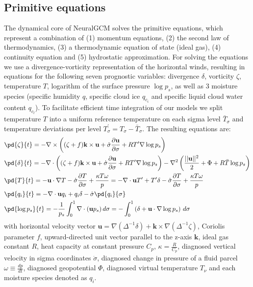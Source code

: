 \subsection{Primitive equations}\label{apx:subsec:dycore_equations}
The dynamical core of NeuralGCM solves the primitive equations, which represent a combination of (1) momentum equations, (2) the second law of thermodynamics, (3) a thermodynamic equation of state (ideal gas), (4) continuity equation and (5) hydrostatic approximation. For solving the equations we use a divergence-vorticity representation of the horizontal winds, resulting in equations for the following seven prognostic variables: divergence $\delta$, vorticity $\zeta$, temperature $T$, logarithm of the surface pressure $\log p_{s}$, as well as $3$ moisture species (specific humidity $q$, specific cloud ice $q_{c_i}$ and specific liquid cloud water content $q_{c_l}$). To facilitate efficient time integration of our models we split temperature $T$ into a uniform reference temperature on each sigma level $\bar{T}_{\sigma}$ and temperature deviations per level $T^{\prime}_{\sigma} = T_\sigma - \bar{T}_{\sigma}$. The resulting equations are:
\begin{align}
\begin{split}
&\pd{\zeta}{t} =-\nabla\times\left((\zeta + f)\mathbf k\times\mathbf u
    +\dot\sigma\frac{\partial\mathbf u}{\partial\sigma} + RT^\prime\nabla\log p_s \right) \\
&\pd{\delta}{t} =-\nabla\cdot\left((\zeta + f)\mathbf k\times\mathbf u
    +\dot\sigma\frac{\partial\mathbf u}{\partial\sigma} + RT^\prime\nabla\log p_s \right)
    -\nabla^2\left(\frac{||\mathbf u||^2}{2} + \Phi + R \bar{T}\log p_s \right) \\
&\pd{T}{t} =-\mathbf u\cdot\nabla T -\dot\sigma \frac{\partial T}{\partial \sigma}
    +\frac{\kappa T\omega}{p} =-\nabla\cdot \mathbf u T^\prime + T^\prime\delta
    -\dot\sigma \frac{\partial T}{\partial \sigma} +\frac{\kappa T\omega}{p} \\
&\pd{q_i}{t} =-\nabla\cdot \mathbf{u}q_{i} + q_{i}\delta -\dot{\sigma}\pd{q_{i}}{\sigma}  \\
&\pd{\log p_s}{t} =-\frac{1}{p_s}\int_0^1\nabla\cdot(\mathbf up_s)\,d\sigma
    =-\int_0^1\left(\delta +\mathbf u\cdot\nabla\log p_s\right)\,d\sigma
\label{eq:primitive_equations}
\end{split}
\end{align}
with horizontal velocity vector $\mathbf{u}=\nabla(\Delta^{-1}\delta) + \mathbf{k} \times\nabla(\Delta^{-1}\zeta)$, Coriolis parameter $f$, upward-directed unit vector parallel to the z-axis $\mathbf{k}$, ideal gas constant $R$, heat capacity at constant pressure $C_{p}$,  $\kappa= \frac{R}{C_{p}}$, diagnosed vertical velocity in sigma coordinates $\dot{\sigma}$, diagnosed change in pressure of a fluid parcel $\omega \equiv \frac{dp}{dt}$, diagnosed geopotential $\Phi$, diagnosed virtual temperature $T_{\nu}$ and each moisture species denoted as $q_{i}$.

